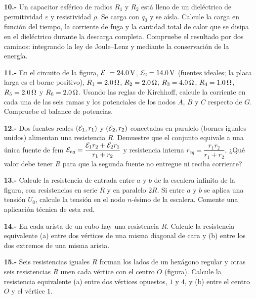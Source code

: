 \documentclass[11pt]{article}
\newcommand{\grupo}[1]{\par\medskip{\color{azul}\bfseries Grupo #1}\par\smallskip}
\newcommand{\p}[1]{\par\smallskip\textbf{#1.-} }
\begin{document}
\p{10} Un capacitor esférico de radios $R_1$ y $R_2$ está lleno de un dieléctrico de permitividad $\varepsilon$ y resistividad $\rho$. Se carga con $q_0$ y se aísla. Calcule la carga en función del tiempo, la corriente de fuga y la cantidad total de calor que se disipa en el dieléctrico durante la descarga completa. Compruebe el resultado por dos caminos: integrando la ley de Joule--Lenz y mediante la conservación de la energía.

\grupo{III}
\p{11} En el circuito de la figura, $\fem_1=24.0\uu{V}$, $\fem_2=14.0\uu{V}$ (fuentes ideales; la placa larga es el borne positivo), $R_1=2.0\ohm$, $R_2=2.0\ohm$, $R_3=4.0\ohm$, $R_4=1.0\ohm$, $R_5=2.0\ohm$ y $R_6=2.0\ohm$. Usando las reglas de Kirchhoff, calcule la corriente en cada una de las seis ramas y los potenciales de los nodos $A$, $B$ y $C$ respecto de $G$. Compruebe el balance de potencias.
\begin{center}\circSdosK\end{center}

\p{12} Dos fuentes reales $(\fem_1,r_1)$ y $(\fem_2,r_2)$ conectadas en paralelo (bornes iguales unidos) alimentan una resistencia $R$. Demuestre que el conjunto equivale a una única fuente de fem $\fem_{eq}=\dfrac{\fem_1r_2+\fem_2r_1}{r_1+r_2}$ y resistencia interna $r_{eq}=\dfrac{r_1r_2}{r_1+r_2}$. ¿Qué valor debe tener $R$ para que la segunda fuente no entregue ni reciba corriente?

\p{13} Calcule la resistencia de entrada entre $a$ y $b$ de la escalera infinita de la figura, con resistencias en serie $R$ y en paralelo $2R$. Si entre $a$ y $b$ se aplica una tensión $U_0$, calcule la tensión en el nodo $n$-ésimo de la escalera. Comente una aplicación técnica de esta red.
\begin{center}\end{center}

\p{14} En cada arista de un cubo hay una resistencia $R$. Calcule la resistencia equivalente (a) entre dos vértices de una misma diagonal de cara y (b) entre los dos extremos de una misma arista.

\p{15} Seis resistencias iguales $R$ forman los lados de un hexágono regular y otras seis resistencias $R$ unen cada vértice con el centro $O$ (figura). Calcule la resistencia equivalente (a) entre dos vértices opuestos, $1$ y $4$, y (b) entre el centro $O$ y el vértice $1$.
\begin{center}\circRueda\end{center}
\end{document}
